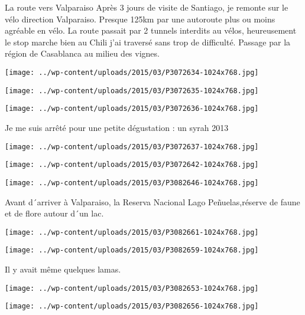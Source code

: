   La route vers Valparaiso \newline
 Après 3 jours de visite de Santiago, je remonte sur le vélo direction Valparaiso. Presque 125km par une autoroute plus ou moins agréable en vélo. La route passait par 2 tunnels interdits au vélos, heureusement le stop marche bien au Chili j'ai traversé sans trop de difficulté. \newline
 Passage par la région de Casablanca au milieu des vignes. \newline
\centerline{\texttt{[image: ../wp-content/uploads/2015/03/P3072634-1024x768.jpg]} } 
 \newline
\centerline{\texttt{[image: ../wp-content/uploads/2015/03/P3072635-1024x768.jpg]} } 
 \newline
\centerline{\texttt{[image: ../wp-content/uploads/2015/03/P3072636-1024x768.jpg]} } 
  Je me suis arrêté pour une petite dégustation : un syrah 2013\newline
\centerline{\texttt{[image: ../wp-content/uploads/2015/03/P3072637-1024x768.jpg]} } 
 \newline
\centerline{\texttt{[image: ../wp-content/uploads/2015/03/P3072642-1024x768.jpg]} } 
 \newline
\centerline{\texttt{[image: ../wp-content/uploads/2015/03/P3082646-1024x768.jpg]} } 
Avant d´arriver à Valparaiso, la Reserva Nacional Lago Peñuelas,réserve de faune et de flore autour d´un lac. \newline
\centerline{\texttt{[image: ../wp-content/uploads/2015/03/P3082661-1024x768.jpg]} } 
 \newline
\centerline{\texttt{[image: ../wp-content/uploads/2015/03/P3082659-1024x768.jpg]} } 
 Il y avait même quelques lamas. \newline
\centerline{\texttt{[image: ../wp-content/uploads/2015/03/P3082653-1024x768.jpg]} } 
 \newline
\centerline{\texttt{[image: ../wp-content/uploads/2015/03/P3082656-1024x768.jpg]} } 
 \newline

\newpage
 
